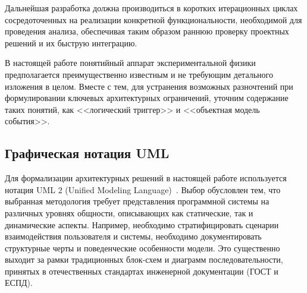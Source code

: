 Дальнейшая разработка должна производиться в коротких итерационных
циклах сосредоточенных на реализации конкретной функциональности,
необходимой для проведения анализа,
обеспечивая таким образом раннюю проверку проектных решений и их
быструю интеграцию.


В настоящей работе понятийный аппарат экспериментальной физики предполагается преимущественно известным и не требующим детального изложения в целом. Вместе с тем, для устранения возможных разночтений при формулировании ключевых архитектурных ограничений, уточним содержание таких понятий, как <<логический триггер>> и <<объектная модель события>>.

\subsection{Графическая нотация UML}

Для формализации архитектурных решений в настоящей работе
используется нотация UML 2 (Unified Modeling
Language)~\cite{uml2-std-iso19505-2, uml-2-book-pilone2012umlRU}.
Выбор обусловлен тем, что выбранная методология требует
представления программной системы на различных уровнях общности,
описывающих как статические, так и динамические аспекты.
Например, необходимо стратифицировать сценарии взаимодействия
пользователя и системы, необходимо документировать структурные
черты и поведенческие особенности модели. Это существенно выходит
за рамки традиционных блок-схем и диаграмм последовательности,
принятых в отечественных стандартах инженерной
документации (ГОСТ и ЕСПД).

